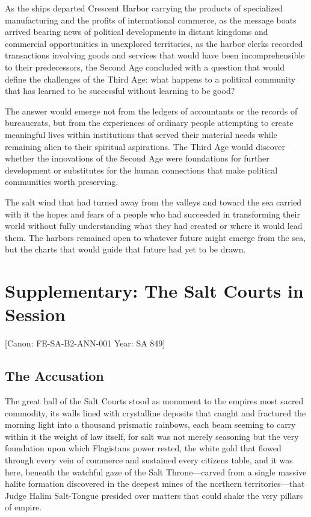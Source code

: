 As the ships departed Crescent Harbor carrying the products of
specialized manufacturing and the profits of international commerce, as
the message boats arrived bearing news of political developments in
distant kingdoms and commercial opportunities in unexplored territories,
as the harbor clerks recorded transactions involving goods and services
that would have been incomprehensible to their predecessors, the Second
Age concluded with a question that would define the challenges of the
Third Age: what happens to a political community that has learned to be
successful without learning to be good?

The answer would emerge not from the ledgers of accountants or the
records of bureaucrats, but from the experiences of ordinary people
attempting to create meaningful lives within institutions that served
their material needs while remaining alien to their spiritual
aspirations. The Third Age would discover whether the innovations of the
Second Age were foundations for further development or substitutes for
the human connections that make political communities worth preserving.

The salt wind that had turned away from the valleys and toward the sea
carried with it the hopes and fears of a people who had succeeded in
transforming their world without fully understanding what they had
created or where it would lead them. The harbors remained open to
whatever future might emerge from the sea, but the charts that would
guide that future had yet to be drawn.

\section{Supplementary: The Salt Courts in
Session}\label{supplementary-the-salt-courts-in-session}

{[}Canon: FE-SA-B2-ANN-001 \textbar{} Year: SA 849{]}

\subsection{The Accusation}\label{the-accusation}

The great hall of the Salt Courts stood as monument to the
empire\textquotesingle s most sacred commodity, its walls lined with
crystalline deposits that caught and fractured the morning light into a
thousand prismatic rainbows, each beam seeming to carry within it the
weight of law itself, for salt was not merely seasoning but the very
foundation upon which Flagistan\textquotesingle s power rested, the
white gold that flowed through every vein of commerce and sustained
every citizen\textquotesingle s table, and it was here, beneath the
watchful gaze of the Salt Throne---carved from a single massive halite
formation discovered in the deepest mines of the northern
territories---that Judge Halim Salt-Tongue presided over matters that
could shake the very pillars of empire.

